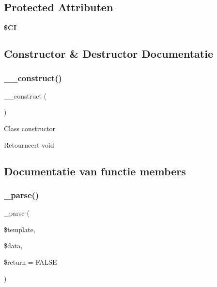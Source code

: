 \subsection*{Protected Attributen}
\begin{DoxyCompactItemize}
\item 
\mbox{\label{class_c_i___parser_ae0314d046ddf7fcfaec03222977427d3}} 
{\bfseries \$\+CI}
\end{DoxyCompactItemize}


\subsection{Constructor \& Destructor Documentatie}
\mbox{\label{class_c_i___parser_a095c5d389db211932136b53f25f39685}} 
\subsubsection{\texorpdfstring{\_\_construct()}{\_\_construct()}}
{\footnotesize\ttfamily \+\_\+\+\_\+construct (\begin{DoxyParamCaption}{ }\end{DoxyParamCaption})}

Class constructor

\begin{DoxyReturn}{Retourneert}
void 
\end{DoxyReturn}


\subsection{Documentatie van functie members}
\mbox{\label{class_c_i___parser_a6bd5ad826db82a61de1f3a13031faaf9}} 
\subsubsection{\texorpdfstring{\_parse()}{\_parse()}}
{\footnotesize\ttfamily \+\_\+parse (\begin{DoxyParamCaption}\item[{}]{\$template,  }\item[{}]{\$data,  }\item[{}]{\$return = {\ttfamily FALSE} }\end{DoxyParamCaption})\hspace{0.3cm}{\ttfamily [protected]}}

